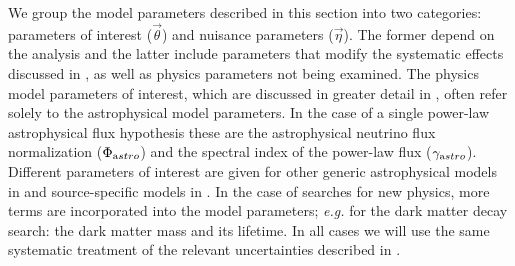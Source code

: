 We group the model parameters described in this section into two categories: parameters of interest ($\vec\theta$) and nuisance parameters ($\vec\eta$).
The former depend on the analysis and the latter include parameters that modify the systematic effects discussed in , as well as physics parameters not being examined.
The physics model parameters of interest, which are discussed in greater detail in , often refer solely to the astrophysical model parameters.
In the case of a single power-law astrophysical flux hypothesis these are the astrophysical neutrino flux normalization ($\Phi_{\textrm astro}$)  and the spectral index of the power-law flux ($\gamma_{\textrm astro}$).
Different parameters of interest are given for other generic astrophysical models in  and source-specific models in .
In the case of searches for new physics, more terms are incorporated into the model parameters; {\it{}e.g.} for the dark matter decay search: the dark matter mass and its lifetime.
In all cases we will use the same systematic treatment of the relevant uncertainties described in .

